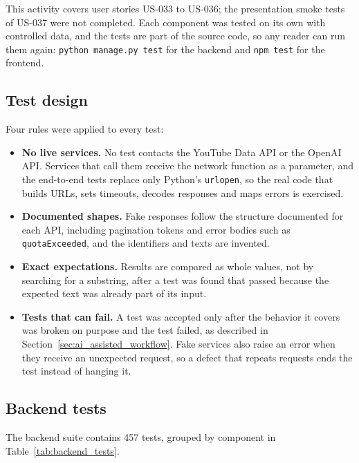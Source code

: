 This activity covers user stories US-033 to US-036; the presentation smoke tests of US-037 were not completed. Each component was tested on its own with controlled data, and the tests are part of the source code, so any reader can run them again: \texttt{python manage.py test} for the backend and \texttt{npm test} for the frontend.

\subsection{Test design}

Four rules were applied to every test:

\begin{itemize}
    \item \textbf{No live services.} No test contacts the YouTube Data API or the OpenAI API. Services that call them receive the network function as a parameter, and the end-to-end tests replace only Python's \texttt{urlopen}, so the real code that builds URLs, sets timeouts, decodes responses and maps errors is exercised.

    \item \textbf{Documented shapes.} Fake responses follow the structure documented for each API, including pagination tokens and error bodies such as \texttt{quotaExceeded}, and the identifiers and texts are invented.

    \item \textbf{Exact expectations.} Results are compared as whole values, not by searching for a substring, after a test was found that passed because the expected text was already part of its input.

    \item \textbf{Tests that can fail.} A test was accepted only after the behavior it covers was broken on purpose and the test failed, as described in Section~\ref{sec:ai_assisted_workflow}. Fake services also raise an error when they receive an unexpected request, so a defect that repeats requests ends the test instead of hanging it.
\end{itemize}

\subsection{Backend tests}

The backend suite contains 457 tests, grouped by component in Table~\ref{tab:backend_tests}.


